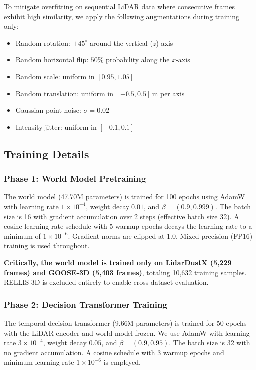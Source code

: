 \documentclass[sensors,article,submit,pdftex,moreauthors]{Definitions/mdpi}
\begin{document}
To mitigate overfitting on sequential LiDAR data where consecutive frames exhibit high similarity, we apply the following augmentations during training only:
\begin{itemize}
    \item Random rotation: $\pm 45^\circ$ around the vertical ($z$) axis
    \item Random horizontal flip: $50\%$ probability along the $x$-axis
    \item Random scale: uniform in $[0.95, 1.05]$
    \item Random translation: uniform in $[-0.5, 0.5]$\,m per axis
    \item Gaussian point noise: $\sigma = 0.02$
    \item Intensity jitter: uniform in $[-0.1, 0.1]$
\end{itemize}

\subsection{Training Details}

\subsubsection{Phase 1: World Model Pretraining}
The world model (47.70M parameters) is trained for 100 epochs using AdamW \cite{loshchilov2019} with learning rate $1 \times 10^{-4}$, weight decay $0.01$, and $\beta = (0.9, 0.999)$. The batch size is 16 with gradient accumulation over 2 steps (effective batch size 32). A cosine learning rate schedule with 5 warmup epochs decays the learning rate to a minimum of $1 \times 10^{-6}$. Gradient norms are clipped at 1.0. Mixed precision (FP16) training is used throughout.

\textbf{Critically, the world model is trained only on LidarDustX (5,229 frames) and GOOSE-3D (5,403 frames)}, totaling 10,632 training samples. RELLIS-3D is excluded entirely to enable cross-dataset evaluation.

\subsubsection{Phase 2: Decision Transformer Training}
The temporal decision transformer (9.66M parameters) is trained for 50 epochs with the LiDAR encoder and world model frozen. We use AdamW with learning rate $3 \times 10^{-4}$, weight decay $0.05$, and $\beta = (0.9, 0.95)$. The batch size is 32 with no gradient accumulation. A cosine schedule with 3 warmup epochs and minimum learning rate $1 \times 10^{-6}$ is employed.
\end{document}

